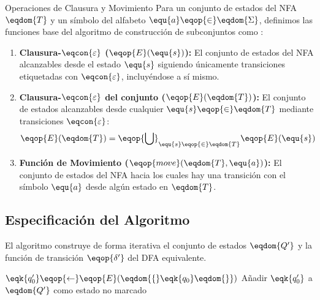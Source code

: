 \begin{definicion}{Operaciones de Clausura y Movimiento}
Para un conjunto de estados del NFA $\eqdom{T}$ y un símbolo del alfabeto $\equ{a} \eqop{\in} \eqdom{\Sigma}$, definimos las funciones base del algoritmo de construcción de subconjuntos como \cite{sipser2012introduction}:
\begin{enumerate}
    \item \textbf{Clausura-$\eqcon{\varepsilon}$ ($\eqop{E}(\equ{s})$):} El conjunto de estados del NFA alcanzables desde el estado $\equ{s}$ siguiendo únicamente transiciones etiquetadas con $\eqcon{\varepsilon}$, incluyéndose a sí mismo.
    \item \textbf{Clausura-$\eqcon{\varepsilon}$ del conjunto ($\eqop{E}(\eqdom{T})$):} El conjunto de estados alcanzables desde cualquier $\equ{s} \eqop{\in} \eqdom{T}$ mediante transiciones $\eqcon{\varepsilon}$:
    \[
    \eqop{E}(\eqdom{T}) = \eqop{\bigcup}_{\equ{s} \eqop{\in} \eqdom{T}} \eqop{E}(\equ{s})
    \]
    \item \textbf{Función de Movimiento ($\eqop{move}(\eqdom{T}, \equ{a})$):} El conjunto de estados del NFA hacia los cuales hay una transición con el símbolo $\equ{a}$ desde algún estado en $\eqdom{T}$.
\end{enumerate}
\end{definicion}

\subsection{Especificación del Algoritmo}

El algoritmo construye de forma iterativa el conjunto de estados $\eqdom{Q'}$ y la función de transición $\eqop{\delta'}$ del DFA equivalente.

\begin{algorithm}[H]
    \DontPrintSemicolon
    
    $\eqk{q'_0} \eqop{\gets} \eqop{E}(\eqdom{\{}\eqk{q_0}\eqdom{\}})$\;
    Añadir $\eqk{q'_0}$ a $\eqdom{Q'}$ como estado no marcado\;
    \caption{Construcción de Subconjuntos \cite{aho2006compilers, sipser2012introduction}}
\end{algorithm}


